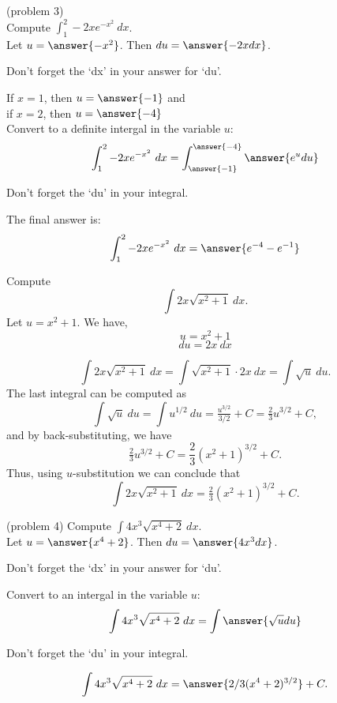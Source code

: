 \documentclass[handout]{ximera}
\begin{document}
\begin{problem}(problem 3)\\
Compute $\displaystyle{\int_1^2 -2xe^{-x^2} \ dx}$.\\
Let $u = \answer{-x^2}$. Then $du = \answer{-2x dx}$.\\
\begin{hint}
Don't forget the `dx' in your answer for `du'.
\end{hint}
If $x = 1$, then $u = \answer{-1}$ and \\
if $x = 2$, then $u = \answer{-4}$\\
Convert to a definite intergal in the variable $u$:
\[\int_1^2 -2xe^{-x^2} \ dx = \int_{\answer{-1}}^{\answer{-4}} \answer{e^u du}\]
\begin{hint}
Don't forget the `du' in your integral.
\end{hint}
The final answer is:
\[\int_1^2 -2xe^{-x^2} \ dx = \answer{e^{-4} - e^{-1}} \]
\end{problem}

\begin{example}[example 4] Compute 
\[\int 2x\sqrt{x^2 + 1} \ dx.\]
Let $u = x^2 + 1$.  We have,
\[u = x^2 + 1\]
\[du = 2x \ dx\]

\[\int 2x\sqrt{x^2 + 1} \ dx = \int \sqrt{x^2 + 1} \cdot 2x\  dx = \int \sqrt{u} \ du.\]
The last integral can be computed as 
\[\int \sqrt u  \ du = \int u^{1/2} \ du = \tfrac{u^{3/2}}{3/2} + C = \tfrac23 u^{3/2} + C,\]
and by back-substituting, we have 
\[\tfrac23 u^{3/2}  + C = \frac23 (x^2 + 1)^{3/2} + C.\]
Thus, using $u$-substitution we can conclude that
\[\int 2x\sqrt{x^2 + 1} \ dx =  \tfrac23 (x^2 + 1)^{3/2} + C.\]
\end{example}

\begin{problem}(problem 4) Compute $\displaystyle{\int 4x^3 \sqrt{x^4 +2} \ dx}$.\\
Let $u = \answer{x^4 + 2}$. Then $du = \answer{4x^3 dx}$.\\
\begin{hint}
Don't forget the `dx' in your answer for `du'.
\end{hint}
Convert to an intergal in the variable $u$:
\[\int 4x^3 \sqrt{x^4 +2} \ dx = \int\answer{\sqrt u du}\]
\begin{hint}
Don't forget the `du' in your integral.
\end{hint}

\[\int 4x^3 \sqrt{x^4 +2} \ dx = \answer{2/3(x^4 +2)^{3/2}} +C.\]
\end{problem}
\end{document}
